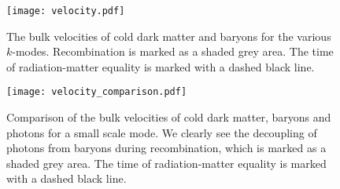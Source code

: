     \begin{figure}
        \texttt{[image: velocity.pdf]}
        \caption{The bulk velocities of cold dark matter and baryons for the various $k$-modes. Recombination is marked as a shaded grey area. The time of radiation-matter equality is marked with a dashed black line.}
        \label{fig:m3:velocity}
    \end{figure}
    
    \begin{figure}
        \texttt{[image: velocity\_comparison.pdf]}
        \caption{Comparison of the bulk velocities of cold dark matter, baryons and photons for a small scale mode. We clearly see the decoupling of photons from baryons during recombination, which is marked as a shaded grey area. The time of radiation-matter equality is marked with a dashed black line.}
        \label{fig:m3:velocity_comparison}
    \end{figure}
    

